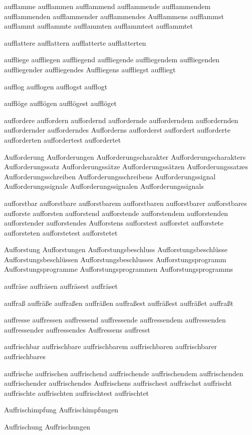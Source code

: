 aufflamme
aufflammen
aufflammend
aufflammende
aufflammendem
aufflammenden
aufflammender
aufflammendes
Aufflammens
aufflammst
aufflammt
aufflammte
aufflammten
aufflammtest
aufflammtet

aufflattere
aufflattern
aufflatterte
aufflatterten

auffliege
auffliegen
auffliegend
auffliegende
auffliegendem
auffliegenden
auffliegender
auffliegendes
Auffliegens
auffliegst
auffliegt

aufflog
aufflogen
aufflogst
aufflogt

aufflöge
aufflögen
aufflögest
aufflöget

auffordere
auffordern
auffordernd
auffordernde
aufforderndem
auffordernden
auffordernder
aufforderndes
Aufforderns
aufforderst
auffordert
aufforderte
aufforderten
auffordertest
auffordertet

Aufforderung
Aufforderungen
Aufforderungscharakter
Aufforderungscharakters
Aufforderungssatz
Aufforderungssätze
Aufforderungssätzen
Aufforderungssatzes
Aufforderungsschreiben
Aufforderungsschreibens
Aufforderungssignal
Aufforderungssignale
Aufforderungssignalen
Aufforderungssignals

aufforstbar
aufforstbare
aufforstbarem
aufforstbaren
aufforstbarer
aufforstbares
aufforste
aufforsten
aufforstend
aufforstende
aufforstendem
aufforstenden
aufforstender
aufforstendes
Aufforstens
aufforstest
aufforstet
aufforstete
aufforsteten
aufforstetest
aufforstetet

Aufforstung
Aufforstungen
Aufforstungsbeschluss
Aufforstungsbeschlüsse
Aufforstungsbeschlüssen
Aufforstungsbeschlusses
Aufforstungsprogramm
Aufforstungsprogramme
Aufforstungsprogrammen
Aufforstungsprogramms

auffräse 
auffräsen 
auffräsest 
auffräset

auffraß
auffräße
auffraßen
auffräßen
auffraßest
auffräßest
auffräßet
auffraßt

auffresse
auffressen
auffressend
auffressende
auffressendem
auffressenden
auffressender
auffressendes
Auffressens
auffresst

auffrischbar
auffrischbare
auffrischbarem
auffrischbaren
auffrischbarer
auffrischbares

auffrische
auffrischen
auffrischend
auffrischende
auffrischendem
auffrischenden
auffrischender
auffrischendes
Auffrischens
auffrischest
auffrischst
auffrischt
auffrischte
auffrischten
auffrischtest
auffrischtet

Auffrischimpfung
Auffrischimpfungen

Auffrischung
Auffrischungen

